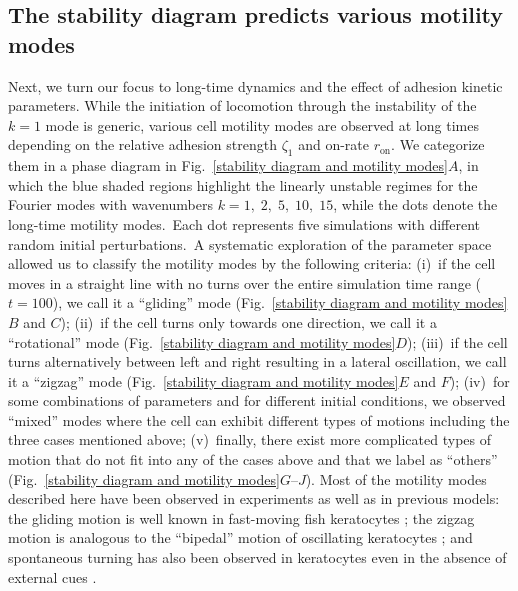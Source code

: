\documentclass[12pt]{article}
\begin{document}
    \subsection*{The stability diagram predicts various motility modes}
Next, we turn our focus to long-time dynamics and the effect of adhesion kinetic parameters. While the initiation of locomotion through the instability of the $k=1$ mode is generic, various cell motility modes are observed at long times depending on the relative adhesion strength $\zeta_1$ and on-rate $r_{\text{on}}$. We categorize them in a phase diagram in Fig.~\ref{stability diagram and motility modes}$A$, in which the blue shaded regions highlight the linearly unstable regimes for the Fourier modes with wavenumbers $k = 1,\;2,\;5,\;10,\;15$, while the dots denote the long-time motility modes.\ 
Each dot represents five simulations with different random initial perturbations.\ A systematic exploration of the parameter space allowed us to classify the motility modes by the following criteria: (i)~if the cell moves in a straight line with no turns over the entire  simulation time range ($t=100$), we call it a ``gliding'' mode (Fig.~\ref{stability diagram and motility modes}$B$ and $C$); (ii)~if the cell turns only towards one direction, we call it a ``rotational'' mode (Fig.~\ref{stability diagram and motility modes}$D$); (iii)~if the cell turns alternatively between left and right resulting in a lateral oscillation, we call it a ``zigzag'' mode (Fig.~\ref{stability diagram and motility modes}$E$ and $F$); (iv)~for some combinations of parameters and for different initial conditions, we observed ``mixed'' modes where the cell can exhibit different types of motions including the three cases mentioned above; (v)~finally, there exist more complicated types of motion that do not fit into any of the cases above and that we label as ``others'' (Fig.~\ref{stability diagram and motility modes}$G$--$J$). 
Most of the motility modes described here have been observed in experiments as well as in previous models: the gliding motion is well known in fast-moving fish keratocytes \cite{verkhovsky1999self}; the zigzag motion is analogous to the ``bipedal'' motion of oscillating keratocytes \cite{barnhart2010bipedal,loosley2012stick}; and spontaneous turning has also been observed in keratocytes even in the absence of external cues \cite{oliver1999separation,allen2020cell}. 
\end{document}
